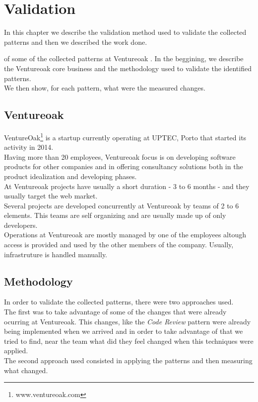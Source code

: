 \chapter{ Validation } \label{chap:validation}
	In this chapter we describe the validation method used to validate the collected patterns and then we described the work done.

	 of some of the collected patterns at Ventureoak . In the beggining, we describe the Ventureoak core business and the methodology used to validate the identified patterns.\\
	We then show, for each pattern, what were the measured changes.

	\section{Ventureoak}
	VentureOak\footnote{www.ventureoak.com} is a startup currently operating at UPTEC, Porto that started its activity in 2014. \\
	Having more than 20 employees, Ventureoak focus is on developing software products for other companies and in offering consultancy solutions both in the product idealization and developing phases. \\
	At Ventureoak projects have usually a short duration - 3 to 6 months - and they usually target the web market. \\
	Several projects are developed concurrently at Ventureoak by teams of 2 to 6 elements. This teams are self organizing and are usually made up of only developers. \\
	Operations at Ventureoak are mostly managed by one of the employees altough access is provided and used by the other members of the company. Usually, infrastruture is handled manually.\\

	\section{Methodology} \label{chap:validation:sec:methodology}
	In order to validate the collected patterns, there were two approaches used. \\
	The first was to take advantage of some of the changes that were already ocurring at Ventureoak. This changes, like the \textit{Code Review} pattern were already being implemented when we arrived and in order to take advantage of that we tried to find, near the team what did they feel changed when this techniques were applied.\\
	The second approach used consisted in applying the patterns and then measuring what changed.

